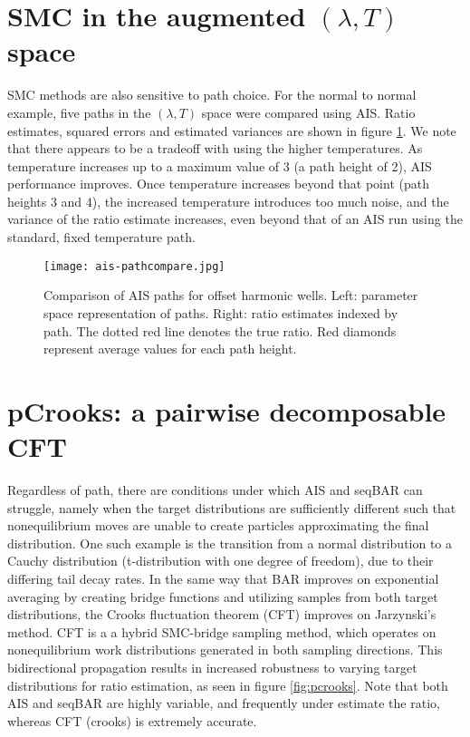 \section{SMC in the augmented $(\lambda, T)$ space}
\label{sec:smcpath}

SMC methods are also sensitive to path choice. 
For the normal to normal example, five paths in the $(\lambda, T)$ space were compared using AIS. 
Ratio estimates, squared errors and estimated variances are shown in figure \ref{fig:AIS-pathcompare}.
We note that there appears to be a tradeoff with using the higher temperatures. 
As temperature increases up to a maximum value of 3 (a path height of 2), AIS performance improves. 
Once temperature increases beyond that point (path heights 3 and 4), the increased temperature introduces too much noise, and the variance of the ratio estimate increases, even beyond that of an AIS run using the standard, fixed temperature path.

\begin{figure}
    \centering
    \texttt{[image: ais-pathcompare.jpg]}
    \caption[Comparison of AIS paths for offset harmonic wells]{Comparison of AIS paths for offset harmonic wells. Left: parameter space representation of paths. Right: ratio estimates indexed by path. The dotted red line denotes the true ratio. Red diamonds represent average values for each path height.}
    \label{fig:AIS-pathcompare}
\end{figure}

\section{pCrooks: a pairwise decomposable CFT}
\label{sec:pcrooks}

Regardless of path, there are conditions under which AIS and seqBAR can struggle, namely when the target distributions are sufficiently different such that nonequilibrium moves are unable to create particles approximating the final distribution. 
One such example is the transition from a normal distribution to a Cauchy distribution (t-distribution with one degree of freedom), due to their differing tail decay rates.
In the same way that BAR improves on exponential averaging by creating bridge functions and utilizing samples from both target distributions, the Crooks fluctuation theorem\cite{crooks2000path} (CFT) improves on Jarzynski's method. 
CFT is a a hybrid SMC-bridge sampling method, which operates on nonequilibrium work distributions generated in both sampling directions.
This bidirectional propagation results in increased robustness to varying target distributions for ratio estimation, as seen in figure \ref{fig:pcrooks}.
Note that both AIS and seqBAR are highly variable, and frequently under estimate the ratio, whereas CFT (crooks) is extremely accurate.

